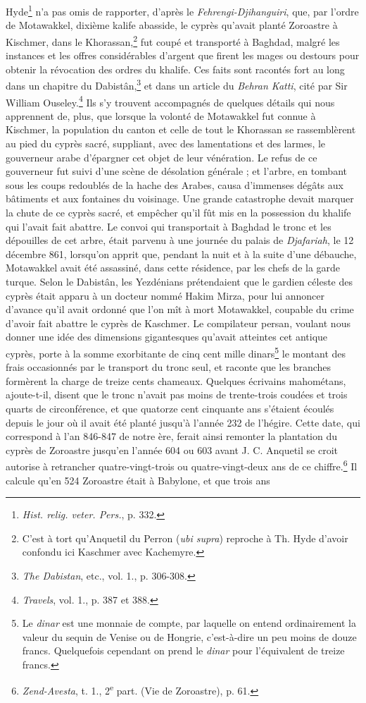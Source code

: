 \documentclass[a4paper, 11pt, oneside, polutonikogreek, french]{article}
\begin{document}
Hyde\footnote{\emph{Hist. relig. veter. Pers.}, p. 332.} n'a pas omis de rapporter, d'après le \emph{Fehrengi-Djihanguiri}, que, par l'ordre de Motawakkel, dixième kalife abasside, le cyprès qu'avait planté Zoroastre à Kischmer, dans le Khorassan,\footnote{C'est à tort qu'Anquetil du Perron (\emph{ubi supra}) reproche à Th. Hyde d'avoir confondu ici Kaschmer avec Kachemyre.} fut coupé et transporté à Baghdad, malgré les instances et les offres considérables d'argent que firent les mages ou destours pour obtenir la révocation des ordres du khalife. Ces faits sont racontés fort au long dans un chapitre du Dabistân,\footnote{\emph{The Dabistan}, etc., vol. 1., p. 306-308.} et dans un article du \emph{Behran Katti}, cité par Sir William Ouseley.\footnote{\emph{Travels}, vol. 1., p. 387 et 388.} Ils s'y trouvent accompagnés de quelques détails qui nous apprennent de, plus, que lorsque la volonté de Motawakkel fut connue à Kischmer, la population du canton et celle de tout le Khorassan se rassemblèrent au pied du cyprès sacré, suppliant, avec des lamentations et des larmes, le gouverneur arabe d'épargner cet objet de leur vénération. Le refus de ce gouverneur fut suivi d'une scène de désolation générale ; et l'arbre, en tombant sous les coups redoublés de la hache des Arabes, causa d'immenses dégâts aux bâtiments et aux fontaines du voisinage. Une grande catastrophe devait marquer la chute de ce cyprès sacré, et empêcher qu'il fût mis en la possession du khalife qui l'avait fait abattre. Le convoi qui transportait à Baghdad le tronc et les dépouilles de cet arbre, était parvenu à une journée du palais de \emph{Djafariah}, le 12 décembre 861, lorsqu'on apprit que, pendant la nuit et à la suite d'une débauche, Motawakkel avait été assassiné, dans cette résidence, par les chefs de la garde turque. Selon le Dabistân, les Yezdénians prétendaient que le gardien céleste des cyprès était apparu à un docteur nommé Hakim Mirza, pour lui annoncer d'avance qu'il avait ordonné que l'on mît à mort Motawakkel, coupable du crime d'avoir fait abattre le cyprès de Kaschmer. Le compilateur persan, voulant nous donner une idée des dimensions gigantesques qu'avait atteintes cet antique cyprès, porte à la somme exorbitante de cinq cent mille dinars\footnote{Le \emph{dinar} est une monnaie de compte, par laquelle on entend ordinairement la valeur du sequin de Venise ou de Hongrie, c'est-à-dire un peu moins de douze francs. Quelquefois cependant on prend le \emph{dinar} pour l'équivalent de treize francs.} le montant des frais occasionnés par le transport du tronc seul, et raconte que les branches formèrent la charge de treize cents chameaux. Quelques écrivains mahométans, ajoute-t-il, disent que le tronc n'avait pas moins de trente-trois coudées et trois quarts de circonférence, et que quatorze cent cinquante ans s'étaient écoulés depuis le jour où il avait été planté jusqu'à l'année 232 de l'hégire. Cette date, qui correspond à l'an 846-847 de notre ère, ferait ainsi remonter la plantation du cyprès de Zoroastre jusqu'en l'année 604 ou 603 avant J. C. Anquetil se croit autorise à retrancher quatre-vingt-trois ou quatre-vingt-deux ans de ce chiffre.\footnote{\emph{Zend-Avesta}, t. 1., 2\textsuperscript{e} part. (Vie de Zoroastre), p. 61.} Il calcule qu'en 524 Zoroastre était à Babylone, et que trois ans 
\end{document}
